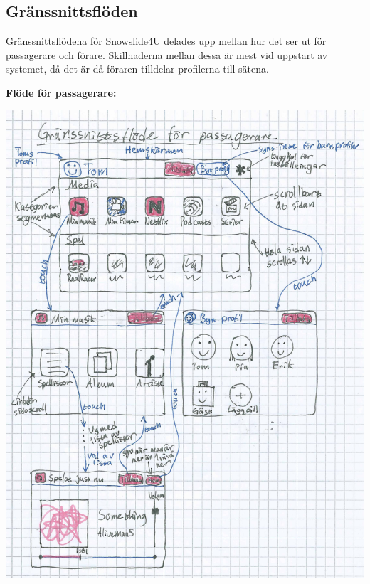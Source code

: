 \documentclass[a4paper,12pt,titlepage]{article}
\begin{document}
\newpage
\subsection*{Gränssnittsflöden}

Gränssnittsflödena för Snowslide4U delades upp mellan hur det ser ut för passagerare och
förare. Skillnaderna mellan dessa är mest vid uppstart av systemet, då det är
då föraren tilldelar profilerna till sätena.

\textbf{Flöde för passagerare:}
\begin{center}
\includegraphics[width=14cm]{images/passflow.jpg}
\end{center}
\end{document}
